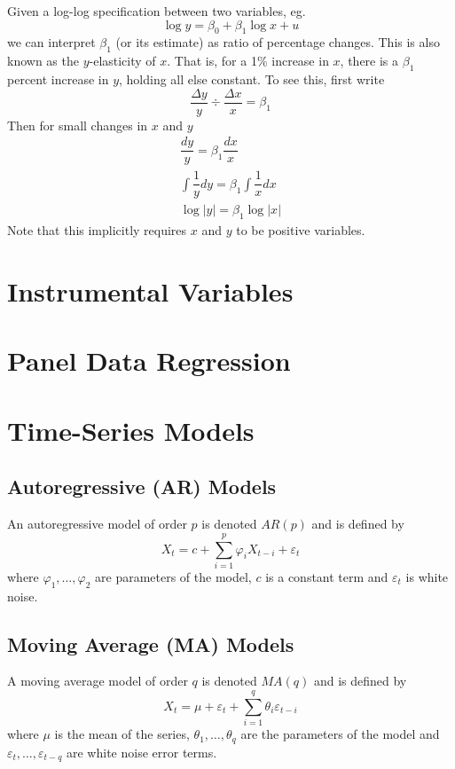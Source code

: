 \documentclass[11pt]{report} %
\begin{document}
Given a log-log specification between two variables, eg.
\begin{equation}
\log y = \beta_{0} + \beta_{1}\log x + u
\end{equation}
we can interpret $\beta_{1}$ (or its estimate) as ratio of percentage changes. This is also known as the $y$-elasticity of $x$. That is, for a 1\% increase in $x$, there is a $\beta_{1}$ percent increase in $y$, holding all else constant. To see this, first write
\begin{equation}
\dfrac{\Delta y}{y} \div \dfrac{\Delta x}{x} = \beta_{1} 
\end{equation}
Then for small changes in $x$ and $y$
\begin{gather}
\dfrac{dy}{y} = \beta_{1}\dfrac{dx}{x} \\
\int\dfrac{1}{y}dy = \beta_{1}\int\dfrac{1}{x}dx \\
\log\left|y\right| = \beta_{1}\log\left|x\right|
\end{gather}
Note that this implicitly requires $x$ and $y$ to be positive variables.

\section{Instrumental Variables}

\section{Panel Data Regression}

\section{Time-Series Models}

\subsection{Autoregressive (AR) Models}
An autoregressive model of order $p$ is denoted $AR\left(p\right)$ and is defined by
\begin{equation}
X_{t} = c + \sum_{i = 1}^{p}\varphi_{i}X_{t - i} + \varepsilon_{t}
\end{equation}
where $\varphi_{1}, \dots, \varphi_{2}$ are parameters of the model, $c$ is a constant term and $\varepsilon_{t}$ is white noise.

\subsection{Moving Average (MA) Models}
A moving average model of order $q$ is denoted $MA\left(q\right)$ and is defined by
\begin{equation}
X_{t} = \mu + \varepsilon_{t} + \sum_{i = 1}^{q}\theta_{i}\varepsilon_{t - i}
\end{equation}
where $\mu$ is the mean of the series, $\theta_{1}, \dots, \theta_{q}$ are the parameters of the model and $\varepsilon_{t}, \dots, \varepsilon_{t - q}$ are white noise error terms.
\end{document}
